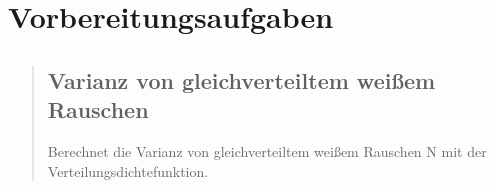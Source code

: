 %     






\section{Vorbereitungsaufgaben}
\begin{quote}
    \hspace{-2em}
    \subsection{Varianz von gleichverteiltem weißem Rauschen}
    Berechnet die Varianz von gleichverteiltem weißem Rauschen N mit der Verteilungsdichtefunktion.\\
    \begin{quote}
    
    \end{quote}
      
\end{quote}



